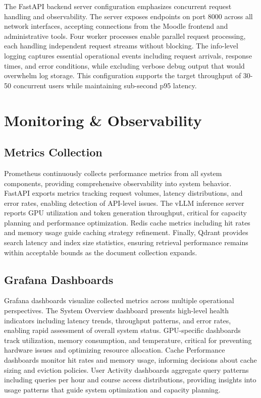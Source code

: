 \documentclass[12pt,a4paper]{article}
\begin{document}
The FastAPI backend server configuration emphasizes concurrent request handling and observability. The server exposes endpoints on port 8000 across all network interfaces, accepting connections from the Moodle frontend and administrative tools. Four worker processes enable parallel request processing, each handling independent request streams without blocking. The info-level logging captures essential operational events including request arrivals, response times, and error conditions, while excluding verbose debug output that would overwhelm log storage. This configuration supports the target throughput of 30-50 concurrent users while maintaining sub-second p95 latency.

\section{Monitoring \& Observability}

\subsection{Metrics Collection}

Prometheus continuously collects performance metrics from all system components, providing comprehensive observability into system behavior. FastAPI exports metrics tracking request volumes, latency distributions, and error rates, enabling detection of API-level issues. The vLLM inference server reports GPU utilization and token generation throughput, critical for capacity planning and performance optimization. Redis cache metrics including hit rates and memory usage guide caching strategy refinement. Finally, Qdrant provides search latency and index size statistics, ensuring retrieval performance remains within acceptable bounds as the document collection expands.

\subsection{Grafana Dashboards}

Grafana dashboards visualize collected metrics across multiple operational perspectives. The System Overview dashboard presents high-level health indicators including latency trends, throughput patterns, and error rates, enabling rapid assessment of overall system status. GPU-specific dashboards track utilization, memory consumption, and temperature, critical for preventing hardware issues and optimizing resource allocation. Cache Performance dashboards monitor hit rates and memory usage, informing decisions about cache sizing and eviction policies. User Activity dashboards aggregate query patterns including queries per hour and course access distributions, providing insights into usage patterns that guide system optimization and capacity planning.
\end{document}
